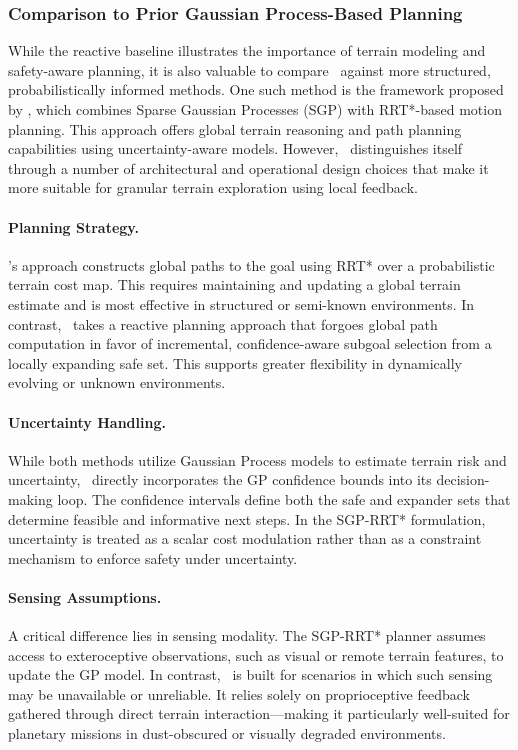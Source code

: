 \subsubsection{Comparison to Prior Gaussian Process-Based Planning}
\label{sec:comparison_prior}

While the reactive baseline illustrates the importance of terrain modeling and safety-aware planning, it is also valuable to compare \algoname\ against more structured, probabilistically informed methods. One such method is the framework proposed by \textcite{leininger2024gaussianprocessbasedtraversabilityanalysis}, which combines Sparse Gaussian Processes (SGP) with RRT*-based motion planning. This approach offers global terrain reasoning and path planning capabilities using uncertainty-aware models. However, \algoname\ distinguishes itself through a number of architectural and operational design choices that make it more suitable for granular terrain exploration using local feedback.

\paragraph{Planning Strategy.} \textcite{leininger2024gaussianprocessbasedtraversabilityanalysis}'s approach constructs global paths to the goal using RRT* over a probabilistic terrain cost map. This requires maintaining and updating a global terrain estimate and is most effective in structured or semi-known environments. In contrast, \algoname\ takes a reactive planning approach that forgoes global path computation in favor of incremental, confidence-aware subgoal selection from a locally expanding safe set. This supports greater flexibility in dynamically evolving or unknown environments.

\paragraph{Uncertainty Handling.} While both methods utilize Gaussian Process models to estimate terrain risk and uncertainty, \algoname\ directly incorporates the GP confidence bounds into its decision-making loop. The confidence intervals define both the safe and expander sets that determine feasible and informative next steps. In the SGP-RRT* formulation, uncertainty is treated as a scalar cost modulation rather than as a constraint mechanism to enforce safety under uncertainty.

\paragraph{Sensing Assumptions.} A critical difference lies in sensing modality. The SGP-RRT* planner assumes access to exteroceptive observations, such as visual or remote terrain features, to update the GP model. In contrast, \algoname\ is built for scenarios in which such sensing may be unavailable or unreliable. It relies solely on proprioceptive feedback gathered through direct terrain interaction—making it particularly well-suited for planetary missions in dust-obscured or visually degraded environments.

